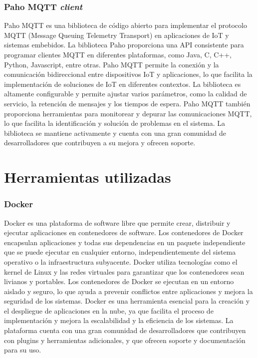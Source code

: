 \subsubsection{Paho MQTT \textit{client}}

 Paho MQTT es una biblioteca de código abierto para implementar el protocolo MQTT (Message Queuing Telemetry Transport) en aplicaciones de IoT y sistemas embebidos. La biblioteca Paho proporciona una API consistente para programar clientes MQTT en diferentes plataformas, como Java, C, C++, Python, Javascript, entre otras. Paho MQTT permite la conexión y la comunicación bidireccional entre dispositivos IoT y aplicaciones, lo que facilita la implementación de soluciones de IoT en diferentes contextos. La biblioteca es altamente configurable y permite ajustar varios parámetros, como la calidad de servicio, la retención de mensajes y los tiempos de espera. Paho MQTT también proporciona herramientas para monitorear y depurar las comunicaciones MQTT, lo que facilita la identificación y solución de problemas en el sistema. La biblioteca se mantiene activamente y cuenta con una gran comunidad de desarrolladores que contribuyen a su mejora y ofrecen soporte.


\section{Herramientas utilizadas}


\subsubsection{Docker}

Docker es una plataforma de software libre que permite crear, distribuir y ejecutar aplicaciones en contenedores de software. Los contenedores de Docker encapsulan aplicaciones y todas sus dependencias en un paquete independiente que se puede ejecutar en cualquier entorno, independientemente del sistema operativo o la infraestructura subyacente. Docker utiliza tecnologías como el kernel de Linux y las redes virtuales para garantizar que los contenedores sean livianos y portables. Los contenedores de Docker se ejecutan en un entorno aislado y seguro, lo que ayuda a prevenir conflictos entre aplicaciones y mejora la seguridad de los sistemas. Docker es una herramienta esencial para la creación y el despliegue de aplicaciones en la nube, ya que facilita el proceso de implementación y mejora la escalabilidad y la eficiencia de los sistemas. La plataforma cuenta con una gran comunidad de desarrolladores que contribuyen con plugins y herramientas adicionales, y que ofrecen soporte y documentación para su uso.


